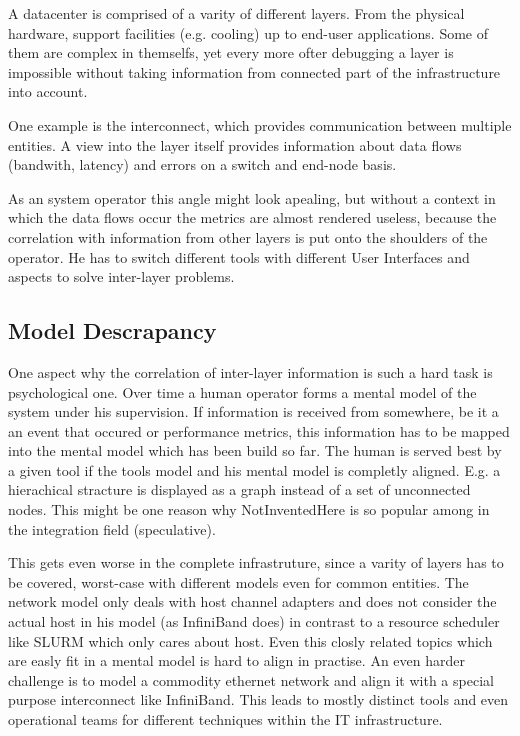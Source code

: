 A datacenter is comprised of a varity of different layers. From the physical hardware, support facilities (e.g. cooling) up to end-user applications.
Some of them are complex in themselfs, yet every more ofter debugging a layer is impossible without taking information from connected part of the infrastructure into account.

One example is the interconnect, which provides communication between multiple entities.
A view into the layer itself provides information about data flows (bandwith, latency) and errors on a switch and end-node basis.

As an system operator this angle might look apealing, but without a context in which the data flows occur the metrics are almost rendered useless, because
the correlation with information from other layers is put onto the shoulders of the operator.
He has to switch different tools with different User Interfaces and aspects to solve inter-layer problems.
\subsection{Model Descrapancy}
One aspect why the correlation of inter-layer information is such a hard task is psychological one. Over time a human operator forms a mental model
of the system under his supervision. If information is received from somewhere, be it a an event that occured or performance metrics, this information
has to be mapped into the mental model which has been build so far.
The human is served best by a given tool if the tools model and his mental model is completly aligned.
E.g. a hierachical stracture is displayed as a graph instead of a set of unconnected nodes. This might be one reason why NotInventedHere
is so popular among in the integration field (speculative).


This gets even worse in the complete infrastruture, since a varity of layers has to be covered, worst-case with different models even for common entities.
The network model only deals with host channel adapters and does not consider the actual host in his model (as InfiniBand does) in contrast to a resource
scheduler like SLURM which only cares about host. Even this closly related topics which are easly fit in a mental model is hard to align in practise.
An even harder challenge is to model a commodity ethernet network and align it with a special purpose interconnect like InfiniBand.
This leads to mostly distinct tools and even operational teams for different techniques within the IT infrastructure.

